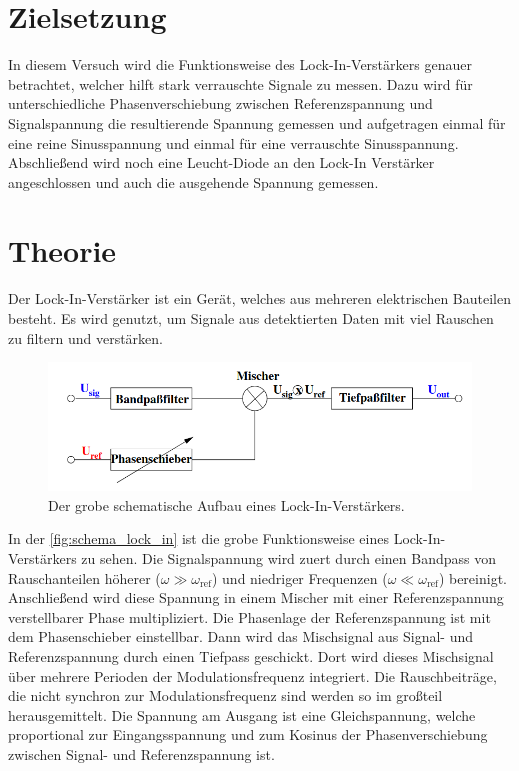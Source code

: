 \section{Zielsetzung}
\label{sec:Zielsetzung}

    In diesem Versuch wird die Funktionsweise des Lock-In-Verstärkers genauer betrachtet, welcher hilft stark verrauschte Signale zu messen.
    Dazu wird für unterschiedliche Phasenverschiebung zwischen Referenzspannung und Signalspannung die resultierende Spannung gemessen und 
    aufgetragen einmal für eine reine Sinusspannung und einmal für eine verrauschte Sinusspannung. Abschließend wird noch eine Leucht-Diode
    an den Lock-In Verstärker angeschlossen und auch die ausgehende Spannung gemessen. 

\section{Theorie}
\label{sec:Theorie}

    Der Lock-In-Verstärker ist ein Gerät, welches aus mehreren elektrischen Bauteilen besteht. Es wird genutzt, um Signale aus detektierten Daten mit viel 
    Rauschen zu filtern und verstärken. %

    \begin{figure}
        \centering
        \includegraphics[width=\textwidth]{bilder/schema_lock_in.png}
        \caption{Der grobe schematische Aufbau eines Lock-In-Verstärkers.}
        \label{fig:schema_lock_in}
    \end{figure}

    \noindent In der \autoref{fig:schema_lock_in} ist die grobe Funktionsweise eines Lock-In-Verstärkers zu sehen. Die Signalspannung wird zuert durch einen Bandpass von
    Rauschanteilen höherer ($\omega \gg \omega_{\text{ref}}$) und niedriger Frequenzen ($\omega \ll \omega_{\text{ref}}$) bereinigt. Anschließend wird diese Spannung in 
    einem Mischer mit einer Referenzspannung verstellbarer Phase multipliziert. Die Phasenlage der Referenzspannung ist mit dem Phasenschieber einstellbar. 
    Dann wird das Mischsignal aus Signal- und Referenzspannung durch einen Tiefpass geschickt. Dort wird dieses Mischsignal über mehrere Perioden der Modulationsfrequenz integriert.
    Die Rauschbeiträge, die nicht synchron zur Modulationsfrequenz sind werden so im großteil herausgemittelt. Die Spannung am Ausgang ist eine Gleichspannung, welche 
    proportional zur Eingangsspannung und zum Kosinus der Phasenverschiebung zwischen Signal- und Referenzspannung ist.

